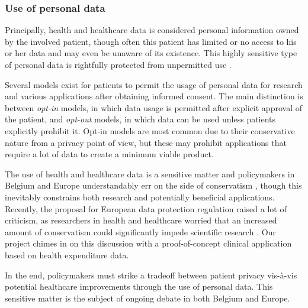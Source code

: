 \subsubsection{Use of personal data}

Principally, health and healthcare data is considered personal information owned by the involved patient, though often this patient has limited or no access to his or her data and may even be unaware of its existence. This highly sensitive type of personal data is rightfully protected from unpermitted use \citep{privacywet,eu_data}.

Several models exist for patients to permit the usage of personal data for research and various applications after obtaining informed consent. The main distinction is between \emph{opt-in} models, in which data usage is permitted after explicit approval of the patient, and \emph{opt-out} models, in which data can be used unless patients explicitly prohibit it. Opt-in models are most common due to their conservative nature from a privacy point of view, but these may prohibit applications that require a lot of data to create a minimum viable product. 

The use of health and healthcare data is a sensitive matter and policymakers in Belgium and Europe understandably err on the side of conservatism \citep{privacywet, eu_data}, though this inevitably constrains both research and potentially beneficial applications. Recently, the proposal for European data protection regulation raised a lot of criticism, as researchers in health and healthcare worried that an increased amount of conservatism could significantly impede scientific research \citep{feam_2, cumbley2013big, fears2014data, wellcome_position_statement, feam_1}. Our project chimes in on this discussion with a proof-of-concept clinical application based on health expenditure data.

In the end, policymakers must strike a tradeoff between patient privacy vis-\`a-vis potential healthcare improvements through the use of personal data. This sensitive matter is the subject of ongoing debate in both Belgium and Europe. 




\cleardoublepage

